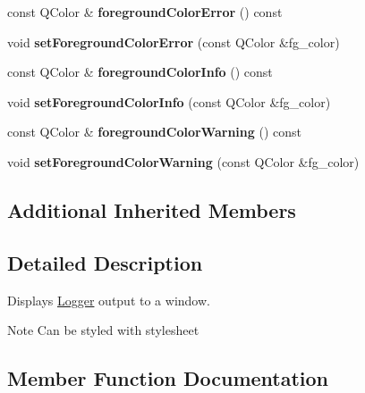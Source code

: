 \begin{DoxyCompactItemize}
const Q\+Color \& {\bfseries foreground\+Color\+Error} () const
\item 
\mbox{\label{classrev_1_1_view_1_1_console_tool_afe40dc38f6c27f936d8bbf5399a0f583}} 
void {\bfseries set\+Foreground\+Color\+Error} (const Q\+Color \&fg\+\_\+color)
\item 
\mbox{\label{classrev_1_1_view_1_1_console_tool_acf55b92c8ab87595e3c13037714daf4b}} 
const Q\+Color \& {\bfseries foreground\+Color\+Info} () const
\item 
\mbox{\label{classrev_1_1_view_1_1_console_tool_a1ef10776236b46ee068e690a206dd8a0}} 
void {\bfseries set\+Foreground\+Color\+Info} (const Q\+Color \&fg\+\_\+color)
\item 
\mbox{\label{classrev_1_1_view_1_1_console_tool_ab61c24e50863e5e621bb38eede59eb38}} 
const Q\+Color \& {\bfseries foreground\+Color\+Warning} () const
\item 
\mbox{\label{classrev_1_1_view_1_1_console_tool_a627abbbb72a6edda228dae26756fb14c}} 
void {\bfseries set\+Foreground\+Color\+Warning} (const Q\+Color \&fg\+\_\+color)
\end{DoxyCompactItemize}
\subsection*{Additional Inherited Members}


\subsection{Detailed Description}
Displays \mbox{\hyperlink{classrev_1_1_logger}{Logger}} output to a window. 

\begin{DoxyNote}{Note}
Can be styled with stylesheet 
\end{DoxyNote}


\subsection{Member Function Documentation}
\mbox{\label{classrev_1_1_view_1_1_console_tool_abffa7bd8ebee59a74578c046ded1fb70}} 
